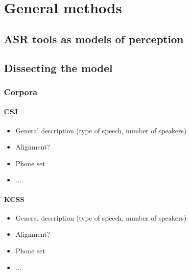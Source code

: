 








\section{General methods}
\subsection{ASR tools as models of perception}

\subsection{Dissecting the model}

\subsubsection{Corpora}
\paragraph{CSJ}
\begin{itemize}
\item General description (type of speech, number of speakers)
\item Alignment?
\item Phone set
\item ...
\end{itemize}

\paragraph{KCSS}
\begin{itemize}
\item General description (type of speech, number of speakers)
\item Alignment?
\item Phone set
\item ...
\end{itemize}

